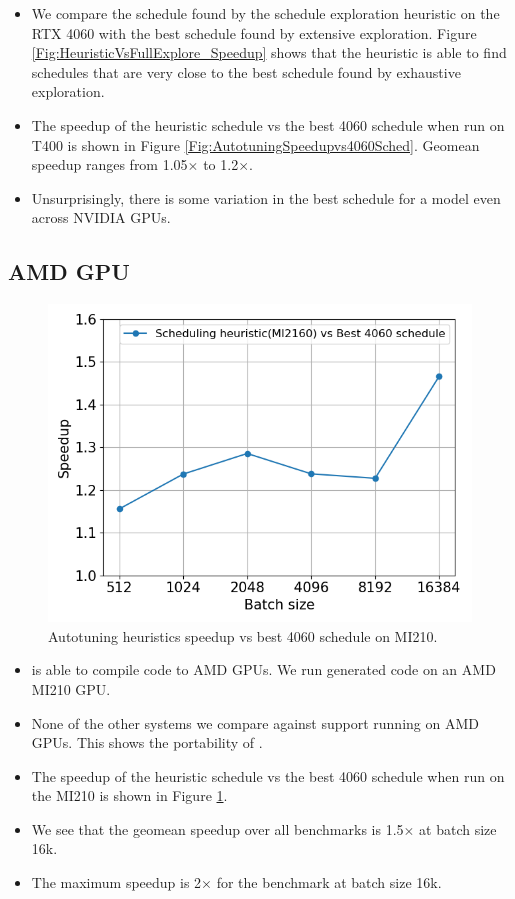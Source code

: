 \begin{itemize}
  \item We compare the schedule found by the schedule exploration heuristic on the RTX 4060 with the best schedule found by
  extensive exploration. Figure \ref{Fig:HeuristicVsFullExplore_Speedup} shows that the heuristic is able to find schedules that are
  very close to the best schedule found by exhaustive exploration.
  \item The speedup of the heuristic schedule vs the best 4060 schedule when run on T400 is shown in Figure \ref{Fig:AutotuningSpeedupvs4060Sched}.
  Geomean speedup ranges from 1.05$\times$ to 1.2$\times$. 
  \item Unsurprisingly, there is some variation in the best schedule for a model even across NVIDIA GPUs.
\end{itemize}

\subsection{AMD GPU}
\begin{figure}[htb]
  \centering
  \includegraphics[width=0.75\linewidth]{figures/geomean_speedup_AMDMI2160_4060_vs_MI2160.png}
  \caption{Autotuning heuristics speedup vs best 4060 schedule on MI210.}
  \label{Fig:AMD_MI210_ATHeuristicVs4060Sched_speedup}
\end{figure}

\begin{itemize}
  \item \Treebeard{} is able to compile code to AMD GPUs. We run generated code on an AMD MI210 GPU.
  \item None of the other systems we compare against support running on AMD GPUs. This shows the portability of \Treebeard{}.
  \item The speedup of the heuristic schedule vs the best 4060 schedule when run on the MI210 is shown in Figure \ref{Fig:AMD_MI210_ATHeuristicVs4060Sched_speedup}.
  \item We see that the geomean speedup over all benchmarks is 1.5$\times$ at batch size 16k.
  \item The maximum speedup is 2$\times$ for the  benchmark at batch size 16k.
\end{itemize}

